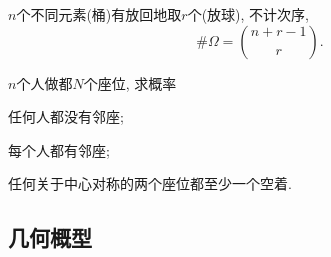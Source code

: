 \documentclass[../Statistics.tex]{subfiles}
\begin{document}
\begin{finale}
    $n$个不同元素(桶)有放回地取$r$个(放球), 不计次序,
    \[ \# \Omega = \binom{n+r-1}{r}. \]
\end{finale}
\begin{sample}
    \begin{ex}
        $n$个人做都$N$个座位, 求概率
        \begin{cenum}
            \item 任何人都没有邻座;
            \item 每个人都有邻座;
            \item 任何关于中心对称的两个座位都至少一个空着.
        \end{cenum}
    \end{ex}
\end{sample}



\subsection{几何概型} %
\label{sub:几何概型}
\end{document}
